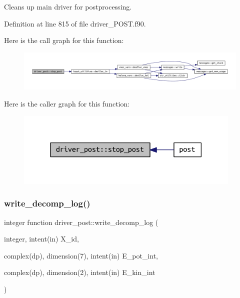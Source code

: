 Cleans up main driver for postprocessing. 



Definition at line 815 of file driver\+\_\+\+P\+O\+S\+T.\+f90.

Here is the call graph for this function\+:\nopagebreak
\begin{figure}[H]
\begin{center}
\leavevmode
\includegraphics[width=350pt]{namespacedriver__post_a71f9fb1935222111e1c7cfc15c5d0269_cgraph}
\end{center}
\end{figure}
Here is the caller graph for this function\+:\nopagebreak
\begin{figure}[H]
\begin{center}
\leavevmode
\includegraphics[width=306pt]{namespacedriver__post_a71f9fb1935222111e1c7cfc15c5d0269_icgraph}
\end{center}
\end{figure}
\mbox{\label{namespacedriver__post_a4981c6c0e63b862c92ba240f43e22e77}} 
\subsubsection{\texorpdfstring{write\+\_\+decomp\+\_\+log()}{write\_decomp\_log()}}
{\footnotesize\ttfamily integer function driver\+\_\+post\+::write\+\_\+decomp\+\_\+log (\begin{DoxyParamCaption}\item[{integer, intent(in)}]{X\+\_\+id,  }\item[{complex(dp), dimension(7), intent(in)}]{E\+\_\+pot\+\_\+int,  }\item[{complex(dp), dimension(2), intent(in)}]{E\+\_\+kin\+\_\+int }\end{DoxyParamCaption})}



